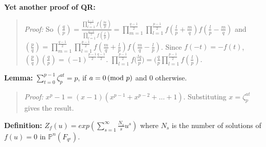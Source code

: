 {\bf Yet another proof of QR:}
\begin{quote}
\emph{Proof:} 
So $({\frac q p})= {\frac
{\prod_{l=1}^{\frac {p-1} 2} f({\frac {la} {p}})}
{\prod_{l=1}^{\frac {p-1} 2} f({\frac {l} {p}})} }= 
\prod_{m=1}^{\frac {q-1} 2} \prod_{l=1}^{\frac {p-1} 2} 
f({\frac {l} {p}}+ {\frac m q})f({\frac {l} {p}}- {\frac m q})$
and
$({\frac p q})= 
\prod_{m=1}^{\frac {q-1} 2} \prod_{l=1}^{\frac {p-1} 2} 
f({\frac {m} {q}}+ {\frac l p})f({\frac {m} {q}}- {\frac l p})$.
Since $f(-t)=-f(t)$,
$({\frac p q})({\frac q p}) =
(-1)^{{\frac {p-1} 2} {\frac {q-1} 2}}$.
$\prod_{l=1}^{\frac {p-1} 2} f({\frac {lq} {p})= (\frac q p} \prod_{l=1}^{\frac {p-1} 2}
f({\frac l p})$.
\end{quote}
{\bf Lemma:} $\sum_{t=0}^{p-1} \zeta_p^{at} = p$, if $a=0 \thinspace \textnormal{(mod } p \textnormal{)}$ and $0$ otherwise.
\begin{quote}
\emph{Proof:}  $x^p - 1 = (x - 1) (x^{p-1} + x^{p-2} + \ldots + 1)$.  Substituting
$x = \zeta_p^{at}$ gives the result.
\end{quote}
{\bf Definition:} $Z_f(u)= exp(\sum_{s=1}^{\infty} {\frac {N_s} s} u^s)$ where
$N_s$ is the number of solutions of $f(u)= 0$ in ${\mathbb P}^n(F_{q^s})$.
